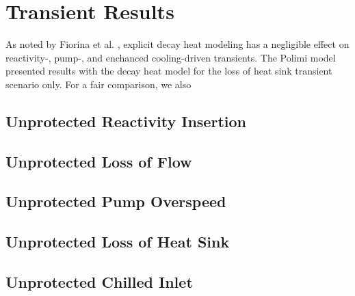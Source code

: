 \section{Transient Results}

As noted by Fiorina et al. \cite{fiorina_modelling_2014}, explicit decay heat
modeling has a negligible effect on reactivity-, pump-, and enchanced
cooling-driven transients. The Polimi model presented results with the decay
heat model for the loss of heat sink transient scenario only. For a fair
comparison, we also 

\subsection{Unprotected Reactivity Insertion}

\subsection{Unprotected Loss of Flow}

\subsection{Unprotected Pump Overspeed}

\subsection{Unprotected Loss of Heat Sink}

\subsection{Unprotected Chilled Inlet}
